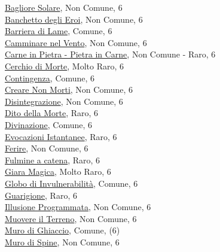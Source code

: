 \begin{multicols}{3}
{{\hyperlink{Bagliore Solare}{Bagliore Solare}, Non Comune, 6\\
\hyperlink{Banchetto degli Eroi}{Banchetto degli Eroi}, Non Comune, 6\\
\hyperlink{Barriera di Lame}{Barriera di Lame}, Comune, 6\\
\hyperlink{Camminare nel Vento}{Camminare nel Vento}, Non Comune, 6\\
\hyperlink{Carne in Pietra - Pietra in Carne}{Carne in Pietra - Pietra in Carne}, Non Comune - Raro, 6\\
\hyperlink{Cerchio di Morte}{Cerchio di Morte}, Molto Raro, 6\\
\hyperlink{Contingenza}{Contingenza}, Comune, 6\\
\hyperlink{Creare Non Morti}{Creare Non Morti}, Non Comune, 6\\
\hyperlink{Disintegrazione}{Disintegrazione}, Non Comune, 6\\
\hyperlink{Dito della Morte}{Dito della Morte}, Raro, 6\\
\hyperlink{Divinazione}{Divinazione}, Comune, 6\\
\hyperlink{Evocazioni Istantanee}{Evocazioni Istantanee}, Raro, 6\\
\hyperlink{Ferire}{Ferire}, Non Comune, 6\\
\hyperlink{Fulmine a catena}{Fulmine a catena}, Raro, 6\\
\hyperlink{Giara Magica}{Giara Magica}, Molto Raro, 6\\
\hyperlink{Globo di Invulnerabilità}{Globo di Invulnerabilità}, Comune, 6\\
\hyperlink{Guarigione}{Guarigione}, Raro, 6\\
\hyperlink{Illusione Programmata}{Illusione Programmata}, Non Comune, 6\\
\hyperlink{Muovere il Terreno}{Muovere il Terreno}, Non Comune, 6\\
\hyperlink{Muro di Ghiaccio}{Muro di Ghiaccio}, Comune, (6)\\
\hyperlink{Muro di Spine}{Muro di Spine}, Non Comune, 6\\
}}
\end{multicols}

